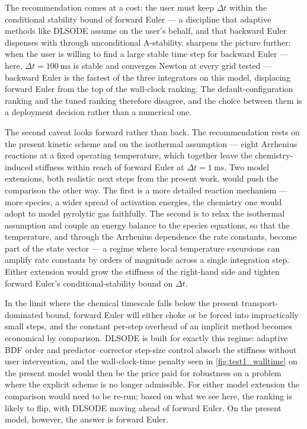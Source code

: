 The recommendation comes at a cost: the user must keep \(\Delta t\) within the conditional stability bound of forward Euler --- a discipline that adaptive methods like DLSODE assume on the user's behalf, and that backward Euler dispenses with through unconditional A-stability.  sharpens the picture further: when the user is willing to find a large stable time step for backward Euler --- here, \(\Delta t = \SI{100}{\milli\second}\) is stable and converges Newton at every grid tested --- backward Euler is the fastest of the three integrators on this model, displacing forward Euler from the top of the wall-clock ranking. The default-configuration ranking and the tuned ranking therefore disagree, and the choice between them is a deployment decision rather than a numerical one.

The second caveat looks forward rather than back. The recommendation rests on the present kinetic scheme and on the isothermal assumption --- eight Arrhenius reactions at a fixed operating temperature, which together leave the chemistry-induced stiffness within reach of forward Euler at \(\Delta t = \SI{1}{\milli\second}\). Two model extensions, both realistic next steps from the present work, would push the comparison the other way. The first is a more detailed reaction mechanism --- more species, a wider spread of activation energies, the chemistry one would adopt to model pyrolytic gas faithfully. The second is to relax the isothermal assumption and couple an energy balance to the species equations, so that the temperature, and through the Arrhenius dependence the rate constants, become part of the state vector --- a regime where local temperature excursions can amplify rate constants by orders of magnitude across a single integration step. Either extension would grow the stiffness of the right-hand side and tighten forward Euler's conditional-stability bound on \(\Delta t\).

\newpage

In the limit where the chemical timescale falls below the present transport-dominated bound, forward Euler will either choke or be forced into impractically small steps, and the constant per-step overhead of an implicit method becomes economical by comparison. DLSODE is built for exactly this regime: adaptive BDF order and predictor--corrector step-size control absorb the stiffness without user intervention, and the wall-clock-time penalty seen in \cref{fig:test1_walltime} on the present model would then be the price paid for robustness on a problem where the explicit scheme is no longer admissible. For either model extension the comparison would need to be re-run; based on what we see here, the ranking is likely to flip, with DLSODE moving ahead of forward Euler. On the present model, however, the answer is forward Euler.
